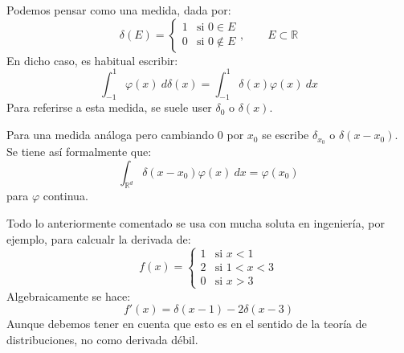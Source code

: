 \begin{itemize}
    Podemos pensar como una medida, dada por:
    \begin{equation*}
        \delta(E) = \left\{\begin{array}{ll}
            1 & \text{si\ } 0\in E \\
            0 & \text{si\ } 0\notin E
        \end{array}\right. , \qquad E\subset\mathbb{R}
    \end{equation*}
    En dicho caso, es habitual escribir:
    \begin{equation*}
        \int_{-1}^{1} \varphi(x)~d\delta(x) = \int_{-1}^{1} \delta(x)\varphi(x)~dx  
    \end{equation*}
    Para referirse a esta medida, se suele user $\delta_0$ o $\delta(x)$.

    Para una medida análoga pero cambiando $0$ por $x_0$ se escribe $\delta_{x_0}$ o $\delta(x-x_0)$. Se tiene así formalmente que:
    \begin{equation*}
        \int_{\mathbb{R}^d}\delta(x-x_0)\varphi(x)~dx = \varphi(x_0)
    \end{equation*}
    para $\varphi$ continua.
\end{itemize}

\begin{ejemplo}
    Todo lo anteriormente comentado se usa con mucha soluta en ingeniería, por ejemplo, para calcualr la derivada de: 
    \begin{equation*}
        f(x) = \left\{\begin{array}{ll}
            1 & \text{si\ } x<1 \\
            2 & \text{si\ } 1<x<3 \\
            0 & \text{si\ } x>3
        \end{array}\right. 
    \end{equation*}
    Algebraicamente se hace:
    \begin{equation*}
        f'(x) = \delta(x-1) -2\delta(x-3)
    \end{equation*}
    Aunque debemos tener en cuenta que esto es en el sentido de la teoría de distribuciones, no como derivada débil.
\end{ejemplo}

